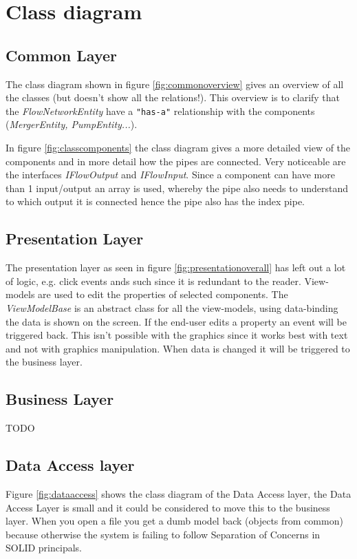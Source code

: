 \chapter{Class diagram}
\section{Common Layer}
The class diagram shown in figure \ref{fig:commonoverview} gives an overview of all the classes (but doesn't show all the relations!). This overview is to clarify that the \emph{FlowNetworkEntity} have a \texttt{"has-a"} relationship with the components (\emph{MergerEntity, PumpEntity...}).

In figure \ref{fig:classcomponents} the class diagram gives a more detailed view of the components and in more detail how the pipes are connected. Very noticeable are the interfaces \emph{IFlowOutput} and \emph{IFlowInput}. Since a component can have more than 1 input/output an array is used, whereby the pipe also needs to understand to which output it is connected hence the pipe also has the index pipe.

\section{Presentation Layer}
The presentation layer as seen in figure \ref{fig:presentationoverall} has left out a lot of logic, e.g. click events ands such since it is redundant to the reader. View-models are used to edit the properties of selected components. The \emph{ViewModelBase} is an abstract class for all the view-models, using data-binding the data is shown on the screen. If the end-user edits a property an event will be triggered back. This isn't possible with the graphics since it works best with text and not with graphics manipulation. When data is changed it will be triggered to the business layer.

\section{Business Layer}
TODO

\section{Data Access layer}
Figure \ref{fig:dataaccess} shows the class diagram of the Data Access layer, the Data Access Layer is small and it could be considered to move this to the business layer. When you open a file you get a dumb model back (objects from common) because otherwise the system is failing to follow Separation of Concerns in SOLID principals.

